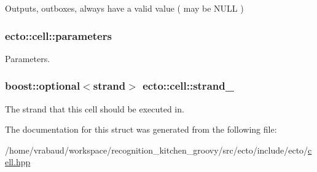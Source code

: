 \-Outputs, outboxes, always have a valid value ( may be \-N\-U\-L\-L ) 

\hypertarget{structecto_1_1cell_ae00a91199c758cf7c24dcf0ecdf70a27}{
\subsubsection[{parameters}]{ {\bf ecto\-::cell\-::parameters}}}\label{structecto_1_1cell_ae00a91199c758cf7c24dcf0ecdf70a27}


\-Parameters. 

\hypertarget{structecto_1_1cell_ada052f06257277c1b53c82226dff5821}{
\subsubsection[{strand\-\_\-}]{\setlength{\rightskip}{0pt plus 5cm}boost\-::optional$<${\bf strand}$>$ {\bf ecto\-::cell\-::strand\-\_\-}}}\label{structecto_1_1cell_ada052f06257277c1b53c82226dff5821}


\-The strand that this cell should be executed in. 



\-The documentation for this struct was generated from the following file\-:\begin{DoxyCompactItemize}
\item 
/home/vrabaud/workspace/recognition\-\_\-kitchen\-\_\-groovy/src/ecto/include/ecto/\hyperlink{cell_8hpp}{cell.\-hpp}\end{DoxyCompactItemize}
